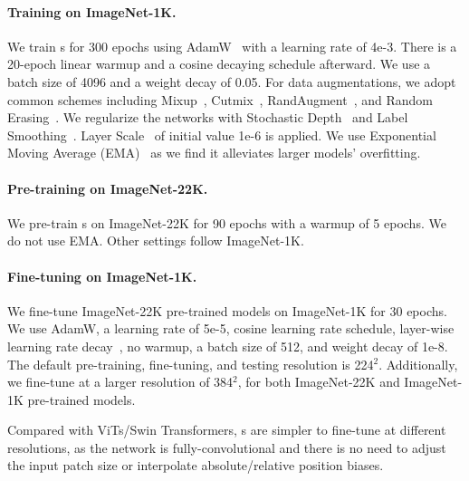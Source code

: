 \paragraph{Training on ImageNet-1K.} We train \cnn{}s for 300 epochs using AdamW~\cite{Loshchilov2019} with a learning rate of 4e-3. There is a 20-epoch linear warmup and a cosine decaying schedule afterward. We use a batch size of 4096 and a weight decay of 0.05. For data augmentations, we adopt common schemes including Mixup~\cite{Zhang2018a}, Cutmix~\cite{Yun2019}, RandAugment~\cite{Cubuk2020}, and Random Erasing~\cite{Zhong2020}. We regularize the networks with Stochastic Depth~\cite{Huang2016deep} and Label Smoothing~\cite{Szegedy2016a}. Layer Scale~\cite{Touvron2021GoingDW} of initial value 1e-6 is applied. We use Exponential Moving Average (EMA)~\cite{Polyak1992} as we find it alleviates larger models' overfitting.

\paragraph{Pre-training on ImageNet-22K.} We pre-train \cnn{}s on ImageNet-22K for 90 epochs with a warmup of 5 epochs. We do not use EMA. Other settings follow ImageNet-1K.

\paragraph{Fine-tuning on ImageNet-1K.}
We fine-tune ImageNet-22K pre-trained models on ImageNet-1K for 30 epochs. We use AdamW, a learning rate of 5e-5, cosine learning rate schedule, layer-wise learning rate decay~\cite{Clark2020,Bao2021}, no warmup, a batch size of 512, and weight decay of 1e-8. 
The default pre-training, fine-tuning, and testing resolution is 224$^2$. Additionally, we fine-tune at a larger resolution of 384$^2$, for both ImageNet-22K and ImageNet-1K pre-trained models. 

Compared with ViTs/Swin Transformers, \cnn{}s are simpler to fine-tune at different resolutions, as the network is fully-convolutional and there is no need to adjust the input patch size or interpolate absolute/relative position biases.

